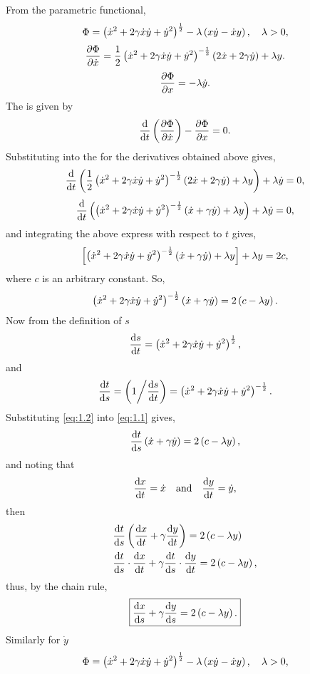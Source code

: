 \def\xd{\dot{x}}%
\def\yd{\dot{y}}%
From the parametric functional,
\[
	\Phi =\lr{\xd^2 + 2\gamma\xd\yd + \yd^2}^\half - \lambda\lr{x\yd - \xd y},\quad \lambda > 0,
\]
\[
	\pderiv{\Phi}{\xd} = \half\lr{\xd^2 + 2\gamma\xd\yd + \yd^2}^{-\half}\lr{2\xd + 2\gamma\yd} + \lambda y.
\]
\[
	\pderiv{\Phi}{x} = -\lambda\yd.
\]
The \el is given by
\[
	\frac{\mathrm{d}}{\mathrm{d}t}\left(\frac{\partial \Phi}{\partial \dot{x}}\right)-\frac{\partial \Phi}{\partial x} = 0.
\]
Substituting into the \el for the derivatives obtained above gives,
\[
	\deriv{}{t}\lr{\half\lr{\xd^2 + 2\gamma\xd\yd + \yd^2}^{-\half}\lr{2\xd + 2\gamma\yd} + \lambda y} + \lambda\yd = 0,
\]
\[
	\deriv{}{t}\lr{\lr{\xd^2 + 2\gamma\xd\yd + \yd^2}^{-\half}\lr{\xd + \gamma\yd} + \lambda y} + \lambda\yd = 0,
\]
and integrating the above express with respect to $t$ gives,
\[
	\lrs{\lr{\xd^2 + 2\gamma\xd\yd + \yd^2}^{-\half}\lr{\xd + \gamma\yd} + \lambda y} + \lambda y = 2c,
\]
where $c$ is an arbitrary constant. So,
\begin{equation}
	\label{eq:1.1}
	\lr{\xd^2 + 2\gamma\xd\yd + \yd^2}^{-\half}\lr{\xd + \gamma\yd} = 2\lr{c - \lambda y}.
\end{equation}
Now from the definition of $s$
\begin{equation*}
	\deriv{s}{t} = \lr{\xd^2 + 2\gamma\xd\yd + \yd^2}^\half,
\end{equation*}
and
\begin{equation}
	\label{eq:1.2}
	\deriv{t}{s} = \left( 1 \middle/ \deriv{s}{t} \right) = \lr{\xd^2 + 2\gamma\xd\yd + \yd^2}^{-\half}.
\end{equation}
Substituting \eqref{eq:1.2} into \eqref{eq:1.1} gives,
\begin{equation*}
	\deriv{t}{s}\lr{\xd + \gamma\yd} = 2\lr{c - \lambda y},
\end{equation*}
and noting that
\begin{equation*}
	\deriv{x}{t} = \xd \quad \textrm{and} \quad \deriv{y}{t} = \yd,
\end{equation*}
then
\begin{align*}
	{}&\frac{\mathrm{d}t}{\mathrm{d}s}\left(\frac{\mathrm{d}x}{\mathrm{d}t} + \gamma\frac{\mathrm{d}y}{\mathrm{d}t}\right) = 2\left(c - \lambda y\right)\\
	{}&\frac{\mathrm{d}t}{\mathrm{d}s}\cdot\frac{\mathrm{d}x}{\mathrm{d}t} + \gamma\frac{\mathrm{d}t}{\mathrm{d}s}\cdot\frac{\mathrm{d}y}{\mathrm{d}t} = 2\left(c - \lambda y\right),
\end{align*}
thus, by the chain rule,
\begin{equation}
	\label{eq:1.3}
	\boxed{\frac{\mathrm{d}x}{\mathrm{d}s} + \gamma\frac{\mathrm{d}y}{\mathrm{d}s} = 2\left(c - \lambda y\right).}
\end{equation}
Similarly for $\yd$
\[
	\Phi =\lr{\xd^2 + 2\gamma\xd\yd + \yd^2}^\half - \lambda\lr{x\yd - \xd y},\quad \lambda > 0,
\]
